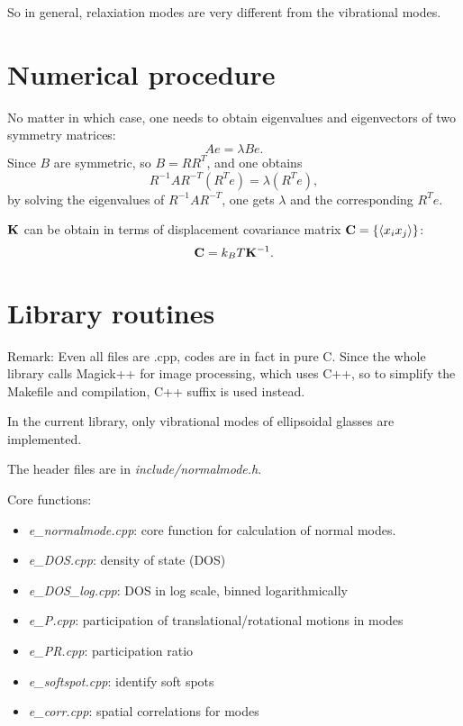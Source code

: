 So in general, relaxiation modes are very different from the vibrational modes.

\section{Numerical procedure}
No matter in which case, one needs to obtain eigenvalues and eigenvectors of two symmetry matrices:
\begin{equation}
Ae=\lambda Be.
\end{equation}
Since $B$ are symmetric, so $B=RR^T$, and one obtains
\begin{equation}
R^{-1}AR^{-T}(R^Te)=\lambda(R^Te),
\end{equation}
by solving the eigenvalues of $R^{-1}AR^{-T}$, one gets $\lambda$ and the corresponding $R^Te$.

$\mathbf{K}$ can be obtain in terms of displacement covariance matrix $\mathbf{C}=\{\langle x_ix_j\rangle\}$:
\begin{equation}
\mathbf{C}=k_BT\mathbf{K}^{-1}.
\end{equation}

\section{Library routines}
Remark: Even all files are .cpp, codes are in fact in pure C. Since the whole library calls Magick++ for image processing, which uses C++, so to simplify the Makefile and compilation, C++ suffix is used instead.

In the current library, only vibrational modes of ellipsoidal glasses are implemented.

The header files are in \emph{include/normalmode.h}.

Core functions:
\begin{itemize}
\item \emph{e\_normalmode.cpp}: core function for calculation of normal modes.
\item \emph{e\_DOS.cpp}: density of state (DOS)
\item \emph{e\_DOS\_log.cpp}: DOS in log scale, binned logarithmically
\item \emph{e\_P.cpp}: participation of translational/rotational motions in modes
\item \emph{e\_PR.cpp}: participation ratio
\item \emph{e\_softspot.cpp}: identify soft spots
\item \emph{e\_corr.cpp}: spatial correlations for modes
\end{itemize}

